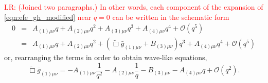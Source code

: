 \documentclass[a4paper,11pt]{article}
\numberwithin{equation}{section}
\begin{document}
\textcolor{red}{LR: (Joined two paragraphs.)}
\textcolor{red}{In other words, each component of the expansion of \eqref{eqn:efe_gh_modified} near $q=0$ can be written in the schematic form}
\begin{eqnarray}\label{eq:efefullexp}
0 
&=& A_{(1)\mu\nu}q+A_{(2)\mu\nu}q^2+A_{(3)\mu\nu}q^3+A_{(4)\mu\nu}q^4+\mathcal{O}(q^5) \nonumber \\
&=& A_{(1)\mu\nu}q+A_{(2)\mu\nu}q^2+(\tilde{\Box}\bar{g}_{(1)\mu\nu}+B_{(3)\mu\nu})q^3+A_{(4)\mu\nu}q^4+\mathcal{O}(q^5)
\end{eqnarray}
or, rearranging the terms in order to obtain wave-like equations,
\begin{equation}
\label{eq:waveEFE}
\tilde{\Box}\bar{g}_{(1)\mu\nu}=-A_{(1)\mu\nu}\frac{1}{q^2}-A_{(2)\mu\nu}\frac{1}{q}-B_{(3)\mu\nu}-A_{(4)\mu\nu}q+\mathcal{O}(q^2).
\end{equation}
\end{document}
